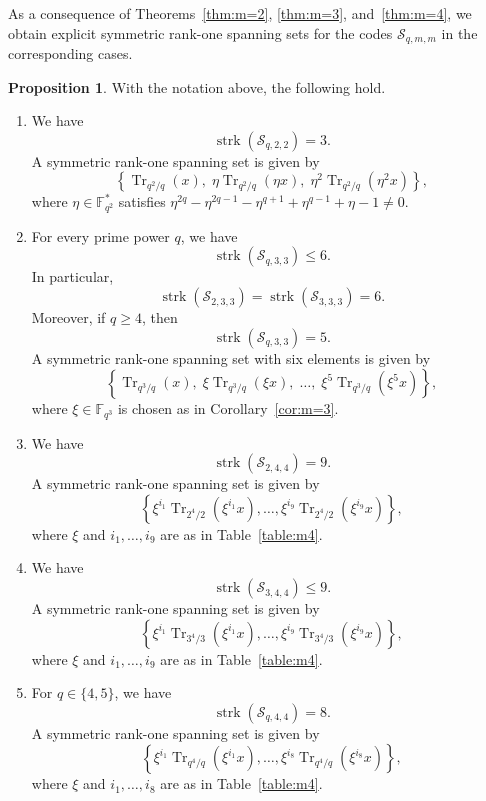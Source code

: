 \documentclass[11pt,a4paper,reqno]{article}
\numberwithin{equation}{section}
\theoremstyle{definition}
\newtheorem{proposition}[theorem]{Proposition}
\begin{document}
As a consequence of Theorems~\ref{thm:m=2}, \ref{thm:m=3}, and~\ref{thm:m=4}, we obtain explicit symmetric rank-one spanning sets for the
codes \(\mathcal S_{q,m,m}\) in the corresponding cases.

\begin{proposition}
With the notation above, the following hold.

\begin{enumerate}
    \item We have \[\operatorname{strk}(\mathcal S_{q,2,2})=3.\] A symmetric rank-one spanning set is given by
    \[
    \left\{
    \operatorname{Tr}_{q^2/q}(x),\;
    \eta \operatorname{Tr}_{q^2/q}(\eta x),\;
    \eta^2 \operatorname{Tr}_{q^2/q}(\eta^2 x)
    \right\},
    \]
    where \(\eta\in \mathbb F_{q^2}^\ast\) satisfies $\eta^{2q}-\eta^{2q-1}-\eta^{q+1}+\eta^{q-1}+\eta-1\neq 0$.


    \item For every prime power \(q\), we have
    \[
    \operatorname{strk}(\mathcal S_{q,3,3})\le 6.
    \]
    In particular,
    \[
    \operatorname{strk}(\mathcal S_{2,3,3})
    =
    \operatorname{strk}(\mathcal S_{3,3,3})
    =
    6.
    \]
    Moreover, if \(q\ge 4\), then
    \[
    \operatorname{strk}(\mathcal S_{q,3,3})=5.
    \]
    A symmetric rank-one spanning set with six elements is given by
    \[
    \left\{
    \operatorname{Tr}_{q^3/q}(x),\;
    \xi\operatorname{Tr}_{q^3/q}(\xi x),\;
    \ldots,\;
    \xi^5\operatorname{Tr}_{q^3/q}(\xi^5 x)
    \right\},
    \]
    where \(\xi\in \mathbb F_{q^3}\) is chosen as in
    Corollary~\ref{cor:m=3}.

    \item We have
    \[
    \operatorname{strk}(\mathcal S_{2,4,4})=9.
    \]
    A symmetric rank-one spanning set is given by
    \[
    \left\{
    \xi^{i_1}\operatorname{Tr}_{2^4/2}(\xi^{i_1}x),\ldots,
    \xi^{i_9}\operatorname{Tr}_{2^4/2}(\xi^{i_9}x)
    \right\},
    \]
    where \(\xi\) and \(i_1,\ldots,i_9\) are as in Table~\ref{table:m4}.

    \item We have
    \[
    \operatorname{strk}(\mathcal S_{3,4,4})\le 9.
    \]
    A symmetric rank-one spanning set is given by
    \[
    \left\{
    \xi^{i_1}\operatorname{Tr}_{3^4/3}(\xi^{i_1}x),\ldots,
    \xi^{i_9}\operatorname{Tr}_{3^4/3}(\xi^{i_9}x)
    \right\},
    \]
    where \(\xi\) and \(i_1,\ldots,i_9\) are as in Table~\ref{table:m4}.

    \item For \(q\in\{4,5\}\), we have
    \[
    \operatorname{strk}(\mathcal S_{q,4,4})=8.
    \]
    A symmetric rank-one spanning set is given by
    \[
    \left\{
    \xi^{i_1}\operatorname{Tr}_{q^4/q}(\xi^{i_1}x),\ldots,
    \xi^{i_8}\operatorname{Tr}_{q^4/q}(\xi^{i_8}x)
    \right\},
    \]
    where \(\xi\) and \(i_1,\ldots,i_8\) are as in Table~\ref{table:m4}.
\end{enumerate}
\end{proposition}
\end{document}
